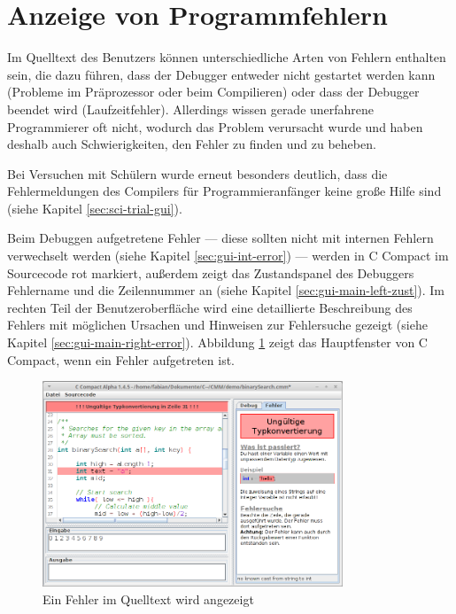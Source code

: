 

\section{Anzeige von Programmfehlern}
\label{sec:deb-error}
Im Quelltext des Benutzers können unterschiedliche Arten von Fehlern enthalten sein, die dazu führen, dass der Debugger entweder nicht gestartet werden kann (Probleme im Präprozessor oder beim Compilieren) oder dass der Debugger beendet wird (Laufzeitfehler). Allerdings wissen gerade unerfahrene Programmierer oft nicht, wodurch das Problem verursacht wurde und haben deshalb auch Schwierigkeiten, den Fehler zu finden und zu beheben.

Bei Versuchen mit Schülern wurde erneut besonders deutlich, dass die Fehlermeldungen des Compilers für Programmieranfänger keine große Hilfe sind (siehe Kapitel \ref{sec:sci-trial-gui}).

Beim Debuggen aufgetretene Fehler --- diese sollten nicht mit internen Fehlern verwechselt werden (siehe Kapitel \ref{sec:gui-int-error}) --- werden in C Compact im Sourcecode rot markiert, außerdem zeigt das Zustandspanel des Debuggers Fehlername und die Zeilennummer an (siehe Kapitel \ref{sec:gui-main-left-zust}). Im rechten Teil der Benutzeroberfläche wird eine detaillierte Beschreibung des Fehlers mit möglichen Ursachen und Hinweisen zur Fehlersuche gezeigt (siehe Kapitel \ref{sec:gui-main-right-error}). Abbildung \ref{fig:deb-error-gui} zeigt das Hauptfenster von C Compact, wenn ein Fehler aufgetreten ist.

\begin{figure}[h!]
\centering
\includegraphics[width=0.8\textwidth]{./media/images/gui/debugger/gui-error-2.png}
\caption{Ein Fehler im Quelltext wird angezeigt}\label{fig:deb-error-gui}
\end{figure}

